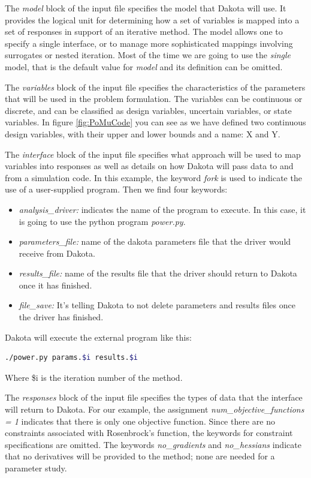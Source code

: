 \documentclass[12pt,a4paper,article]{memoir}
\begin{document}
The \textit{model} block of the input file specifies the model that Dakota will use. It provides the logical unit for determining how a set of variables is mapped into a set of responses in support of an iterative method. The model allows one to specify a single interface, or to manage more sophisticated mappings involving surrogates or nested iteration. 
Most of the time we are going to use the \textit{single} model, that is the default value for \textit{model} and its definition can be omitted.

The \textit{variables} block of the input file specifies the characteristics of the parameters that will be used in the problem formulation. The variables can be continuous or discrete, and can be classified as design variables, uncertain variables, or state variables. In figure \ref{fig:PoMuCode} you can see as we have defined two continuous design variables, with their upper and lower bounds and a name: X and Y.

The \textit{interface} block of the input file specifies what approach will be used to map variables into responses as well as details on how Dakota will pass data to and from a simulation code. In this example, the keyword \textit{fork} is used to indicate the use of a user-supplied program. Then we find four keywords: 

\begin{itemize}
\item \textit{analysis\_driver:} indicates the name of the program to execute. In this case, it is going to use the python program \textit{power.py}. 
\item \textit{parameters\_file:} name of the dakota parameters file that the driver would receive from Dakota.
\item \textit{results\_file:} name of the results file that the driver should return to Dakota once it has finished.
\item \textit{file\_save:} It's telling Dakota to not delete parameters and results files once the driver has finished.
\end{itemize}

Dakota will execute the external program like this:

\begin{lstlisting}[style=MyCodeStyle,language=bash]
./power.py params.$i results.$i
\end{lstlisting}

Where \$i is the iteration number of the method.

The \textit{responses} block of the input file specifies the types of data that the interface will return to Dakota. For our example, the assignment \textit{num\_objective\_functions = 1} indicates that there is only one objective function. Since there are no constraints associated with Rosenbrock's function, the keywords for constraint specifications are omitted. The keywords \textit{no\_gradients} and \textit{no\_hessians} indicate that no
derivatives will be provided to the method; none are needed for a parameter study.
\end{document}
